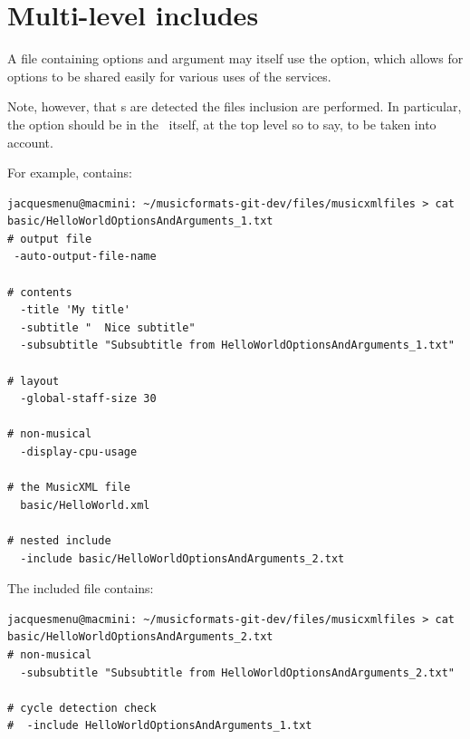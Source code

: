\section{Multi-level includes}

A file containing options and argument may itself use the  option, which allows for options to be shared easily for various uses of the services.

Note, however, that \earlyOption s are detected  the files inclusion are performed. In particular, the  option should be in the \CLI\ itself, at the top level so to say, to be taken into account.

For example,  contains:
\begin{lstlisting}[language=Terminal]
jacquesmenu@macmini: ~/musicformats-git-dev/files/musicxmlfiles > cat basic/HelloWorldOptionsAndArguments_1.txt
# output file
 -auto-output-file-name

# contents
  -title 'My title'
  -subtitle "  Nice subtitle"
  -subsubtitle "Subsubtitle from HelloWorldOptionsAndArguments_1.txt"

# layout
  -global-staff-size 30

# non-musical
  -display-cpu-usage

# the MusicXML file
  basic/HelloWorld.xml

# nested include
  -include basic/HelloWorldOptionsAndArguments_2.txt
\end{lstlisting}

The included  file contains:
\begin{lstlisting}[language=Terminal]
jacquesmenu@macmini: ~/musicformats-git-dev/files/musicxmlfiles > cat basic/HelloWorldOptionsAndArguments_2.txt
# non-musical
  -subsubtitle "Subsubtitle from HelloWorldOptionsAndArguments_2.txt"

# cycle detection check
#  -include HelloWorldOptionsAndArguments_1.txt
\end{lstlisting}

